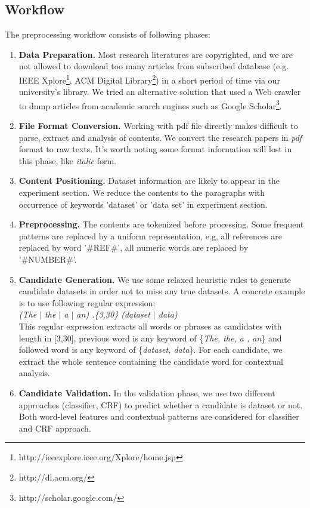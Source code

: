 \documentclass[10pt]{article}
\begin{document}
\subsection{Workflow}
The preprocessing workflow consists of following phases:
\begin{enumerate}
\item \textbf{Data Preparation.} Most research literatures are copyrighted, and we are not allowed to download too many articles from subscribed database (e.g. IEEE Xplore\footnote{http://ieeexplore.ieee.org/Xplore/home.jsp}, ACM Digital Library\footnote{http://dl.acm.org/}) in a short period of time via our university's library. We tried an alternative solution that used a Web crawler to dump articles from academic search engines such as Google Scholar\footnote{http://scholar.google.com/}.
\item \textbf{File Format Conversion.} Working with pdf file directly makes difficult to parse, extract and analysis of contents. We convert the research papers in \emph{pdf} format to raw texts. It's worth noting some format information will lost in this phase, like \emph{italic} form. 
\item \textbf{Content Positioning.} Dataset information are likely to appear in the experiment section. We reduce the contents to the paragraphs with occurrence of keywords 'dataset' or 'data set' in experiment section.
\item \textbf{Preprocessing.} The contents are tokenized before processing. Some frequent patterns are replaced by a uniform representation, e.g, all references are replaced by word '\#REF\#', all numeric words are replaced by '\#NUMBER\#'. 
\item \textbf{Candidate Generation.} We use some relaxed heuristic rules to generate candidate datasets in order not to miss any true datasets. A concrete example is to use following regular expression: \\
\textit{(The $|$ the $|$ a $|$ an) .\{3,30\} (dataset $|$ data)} \\
This regular expression extracts all words or phrases as candidates with length in [3,30], previous word is any keyword of \{\textit{The, the, a , an}\} and followed word is any keyword of \{\textit{dataset, data}\}. For each candidate, we extract the whole sentence containing the candidate word for contextual analysis.
\item \textbf{Candidate Validation.} In the validation phase, we use two different approaches (classifier, CRF) to predict whether a candidate is dataset or not. Both word-level features and contextual patterns are considered for classifier and CRF approach.  
\end{enumerate}
\end{document}
